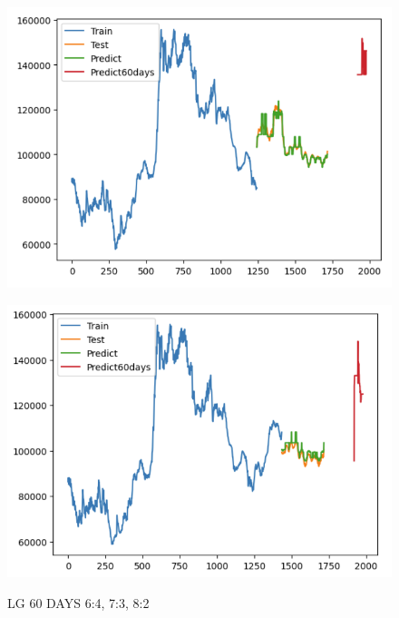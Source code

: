 \documentclass{article}
\begin{document}
\begin{multicols}{2}
\begin{figure}[H]
\begin{minipage}{0.15\textwidth}
    \label{fig:1}
    \end{minipage}%
    \begin{minipage}{0.15\textwidth}
    \centering
    \includegraphics[width=1\textwidth]{Image/Light GBM/LG_7_3_60.png}
  
    \label{fig:2}
    \end{minipage}%
    \begin{minipage}{0.15\textwidth}
    \centering
    \includegraphics[width=1\textwidth]{Image/Light GBM/LG_8_2_60.png}

    \label{fig:3}
    \end{minipage}
    \caption{LG 60 DAYS  6:4, 7:3, 8:2 }
\end{figure}


\end{multicols}
\end{document}

